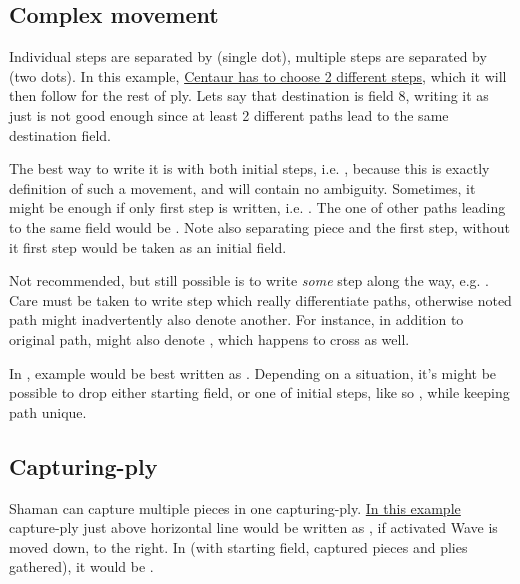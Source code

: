 \subsection*{Complex movement}
\label{sec:Appendix/Notation/Complex movement}

Individual steps are separated by  (single dot), multiple steps are separated by
 (two dots). In this example,
\hyperref[fig:scn_hd_05_centaur_multi_step]{Centaur has to choose 2 different steps},
which it will then follow for the rest of ply. Lets say that destination is field 8,
writing it as just  is not good enough since at least 2 different paths lead
to the same destination field.

The best way to write it is with both initial steps, i.e. , because
this is exactly definition of such a movement, and will contain no ambiguity. Sometimes,
it might be enough if only first step is written, i.e. . The one of other
paths leading to the same  field would be . Note also 
separating piece and the first step, without it first step would be taken as an initial
field.

Not recommended, but still possible is to write \emph{some} step along the way, e.g.
. Care must be taken to write step which really differentiate paths,
otherwise noted path might inadvertently also denote another. For instance, in addition
to original path,  might also denote , which happens
to cross  as well.

In , example would be best written as . Depending on a
situation, it's might be possible to drop either starting field, or one of initial steps,
like so , while keeping path unique.

\subsection*{Capturing-ply}
\label{sec:Appendix/Notation/Capturing-ply}

Shaman can capture multiple pieces in one capturing-ply.
\hyperref[fig:scn_cot_004_light_shaman_capture_ply]{In this example} capture-ply just above
horizontal line would be written as , if activated Wave is moved
down, to the right. In  (with starting field, captured pieces and plies gathered),
it would be \alg{[Hd9.h10*P.l11*P.p12]\~{}[Wp12-n8]}.

